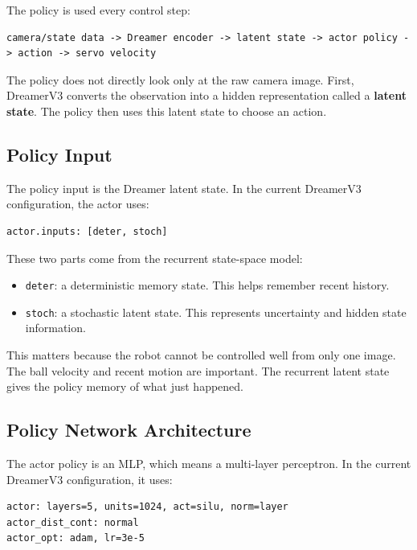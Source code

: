 \documentclass[11pt]{article}
\begin{document}
The policy is used every control step:

\begin{lstlisting}
camera/state data -> Dreamer encoder -> latent state -> actor policy -> action -> servo velocity
\end{lstlisting}

The policy does not directly look only at the raw camera image. First, DreamerV3 converts the observation into a hidden representation called a \textbf{latent state}. The policy then uses this latent state to choose an action.

\subsection{Policy Input}

The policy input is the Dreamer latent state. In the current DreamerV3 configuration, the actor uses:

\begin{lstlisting}
actor.inputs: [deter, stoch]
\end{lstlisting}

These two parts come from the recurrent state-space model:

\begin{itemize}[leftmargin=*]
  \item \texttt{deter}: a deterministic memory state. This helps remember recent history.
  \item \texttt{stoch}: a stochastic latent state. This represents uncertainty and hidden state information.
\end{itemize}

This matters because the robot cannot be controlled well from only one image. The ball velocity and recent motion are important. The recurrent latent state gives the policy memory of what just happened.

\subsection{Policy Network Architecture}

The actor policy is an MLP, which means a multi-layer perceptron. In the current DreamerV3 configuration, it uses:

\begin{lstlisting}
actor: layers=5, units=1024, act=silu, norm=layer
actor_dist_cont: normal
actor_opt: adam, lr=3e-5
\end{lstlisting}
\end{document}
